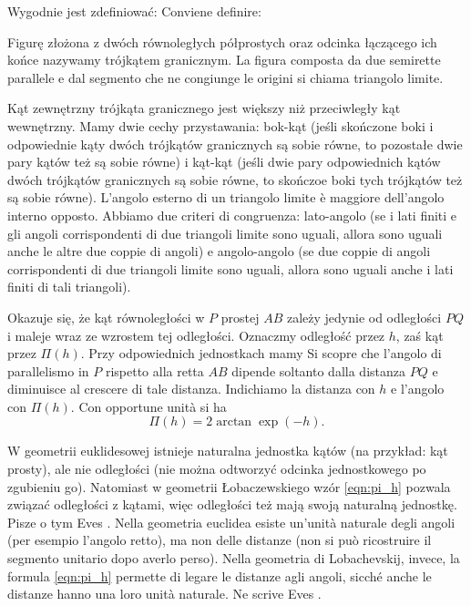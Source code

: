 Wygodnie jest zdefiniować: %
Conviene definire: %

\begin{definition}
[trójkąt graniczny] %
[triangolo limite] %
	Figurę złożona z dwóch równoległych półprostych oraz odcinka łączącego ich końce nazywamy trójkątem granicznym. %
	La figura composta da due semirette parallele e dal segmento che ne congiunge le origini si chiama triangolo limite. %
\end{definition}

Kąt zewnętrzny trójkąta granicznego jest większy niż przeciwległy kąt wewnętrzny. %
Mamy dwie cechy przystawania: bok-kąt (jeśli skończone boki i odpowiednie kąty dwóch trójkątów granicznych są sobie równe, to pozostałe dwie pary kątów też są sobie równe) i kąt-kąt (jeśli dwie pary odpowiednich kątów dwóch trójkątów granicznych są sobie równe, to skończoe boki tych trójkątów też są sobie równe). %
L'angolo esterno di un triangolo limite è maggiore dell'angolo interno opposto. %
Abbiamo due criteri di congruenza: lato-angolo (se i lati finiti e gli angoli corrispondenti di due triangoli limite sono uguali, allora sono uguali anche le altre due coppie di angoli) e angolo-angolo (se due coppie di angoli corrispondenti di due triangoli limite sono uguali, allora sono uguali anche i lati finiti di tali triangoli). %

Okazuje się, że kąt równoległości w $P$ prostej $AB$ zależy jedynie od odległości $PQ$ i maleje wraz ze wzrostem tej odległości. %
Oznaczmy odległość przez $h$, zaś kąt przez $\Pi(h)$. %
Przy odpowiednich jednostkach mamy %
Si scopre che l'angolo di parallelismo in $P$ rispetto alla retta $AB$ dipende soltanto dalla distanza $PQ$ e diminuisce al crescere di tale distanza. %
Indichiamo la distanza con $h$ e l'angolo con $\Pi(h)$. %
Con opportune unità si ha %
\begin{equation}
	\label{eqn:pi_h}
	\Pi(h) = 2 \arctan \exp (-h).
\end{equation}

W geometrii euklidesowej istnieje naturalna jednostka kątów (na przykład: kąt prosty), ale nie odległości (nie można odtworzyć odcinka jednostkowego po zgubieniu go). %
Natomiast w geometrii Łobaczewskiego wzór \ref{eqn:pi_h} pozwala związać odległości z kątami, więc odległości też mają swoją naturalną jednostkę. %
Pisze o tym Eves \cite[s. 297]{eves1_1972}. %
Nella geometria euclidea esiste un'unità naturale degli angoli (per esempio l'angolo retto), ma non delle distanze (non si può ricostruire il segmento unitario dopo averlo perso). %
Nella geometria di Lobachevskij, invece, la formula \ref{eqn:pi_h} permette di legare le distanze agli angoli, sicché anche le distanze hanno una loro unità naturale. %
Ne scrive Eves \cite[p. 297]{eves1_1972}. %

